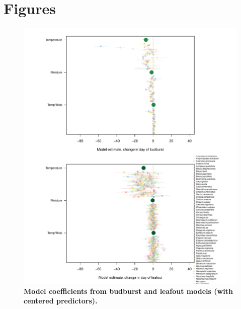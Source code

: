 \documentclass{article}
\begin{document}


\section*{Figures}

\begin{figure}[h]
\centering
 \includegraphics{../../Analyses/soilmoisture/figures/m5_bbdlo_.pdf}
 \caption{\textbf{Model coefficients from budburst and leafout models (with centered predictors).}} 
 \label{fig:bblo}
 \end{figure}
 
\end{document}
